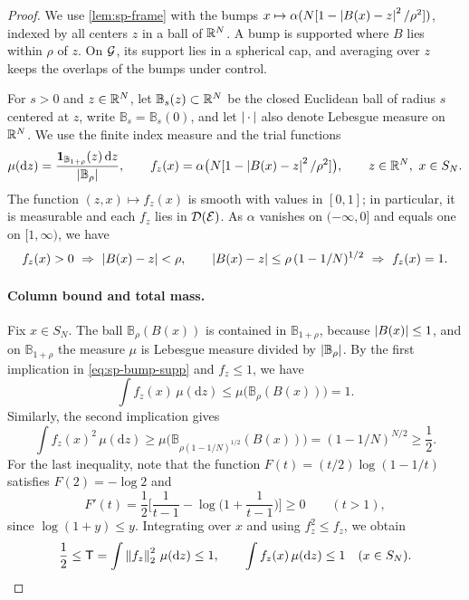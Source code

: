 \begin{proof}
We use \cref{lem:sp-frame} with the bumps $x\mapsto\alpha(N[1-\left|B(x)-z\right|^2/\rho^2])$, indexed by all centers $z$ in a ball of $\mathbb R^N$. A bump is supported where $B$ lies within $\rho$ of $z$. On $\mathcal G$, its support lies in a spherical cap, and averaging over $z$ keeps the overlaps of the bumps under control.

For $s>0$ and $z\in\mathbb R^N$, let $\mathbb B_s(z)\subset\mathbb R^N$ be the closed Euclidean ball of radius $s$ centered at $z$, write $\mathbb B_s=\mathbb B_s(0)$, and let $\left|\,\cdot\,\right|$ also denote Lebesgue measure on $\mathbb R^N$. We use the finite index measure and the trial functions
\[
\mu(\mathrm dz)=\frac{\mathbf 1_{\mathbb B_{1+\rho}}(z)\,\mathrm d z}{\left|\mathbb B_\rho\right|},
\qquad
f_z(x)=\alpha\big(N[1-\left|B(x)-z\right|^2/\rho^2]\big),\qquad z\in\mathbb R^N,\ x\in S_N.
\]
The function $(z,x)\mapsto f_z(x)$ is smooth with values in $[0,1]$; in particular, it is measurable and each $f_z$ lies in $\mathcal D(\mathcal E)$. As $\alpha$ vanishes on $(-\infty,0]$ and equals one on $[1,\infty)$, we have
\begin{equation}\label{eq:sp-bump-supp}
f_z(x)>0\ \Rightarrow\ \left|B(x)-z\right|<\rho,
\qquad
\left|B(x)-z\right|\le\rho\,(1-1/N)^{1/2}\ \Rightarrow\ f_z(x)=1.
\end{equation}

\paragraph{Column bound and total mass.} Fix $x\in S_N$. The ball $\mathbb B_\rho(B(x))$ is contained in $\mathbb B_{1+\rho}$, because $\left|B(x)\right|\le1$, and on $\mathbb B_{1+\rho}$ the measure $\mu$ is Lebesgue measure divided by $\left|\mathbb B_\rho\right|$. By the first implication in \eqref{eq:sp-bump-supp} and $f_z\le1$, we have
\[
\int f_z(x)\,\mu(\mathrm dz)\le\mu\big(\mathbb B_\rho(B(x))\big)=1.
\]
Similarly, the second implication gives
\[
\int f_z(x)^2\,\mu(\mathrm dz)\ge\mu\big(\mathbb B_{\rho(1-1/N)^{1/2}}(B(x))\big)=(1-1/N)^{N/2}\ge\frac12.
\]
For the last inequality, note that the function $F(t)=(t/2)\log(1-1/t)$ satisfies $F(2)=-\log2$ and
\[
F'(t)=\frac12\Big[\frac1{t-1}-\log\Big(1+\frac1{t-1}\Big)\Big]\ge0\qquad(t>1),
\]
since $\log(1+y)\le y$. Integrating over $x$ and using $f_z^2\le f_z$, we obtain
\begin{equation}\label{eq:sp-bump-mass}
\frac12\le\mathsf T=\int\left\lVert f_z\right\rVert_2^2\,\mu(\mathrm dz)\le1,
\qquad
\int f_z(x)\,\mu(\mathrm dz)\le1\quad(x\in S_N).
\end{equation}


\end{proof}
